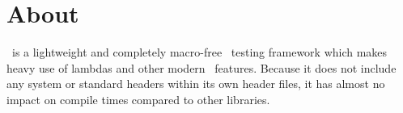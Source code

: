 \section{About}
\voidtest\ is a lightweight and completely macro-free \cplusplus\ testing framework
which makes heavy use of lambdas and other modern \cplusplus\ features. Because it
does not include any system or standard headers within its own header files, it
has almost no impact on compile times compared to other libraries.
